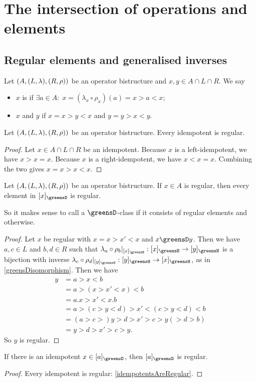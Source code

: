 \section{The intersection of operations and elements}
\subsection{Regular elements and generalised inverses}
\begin{definition}
Let $\left( A, (L, \lambda), (R,\rho) \right)$ be an operator bistructure and $x,y\in A\cap L\cap R$. We say
\begin{itemize}
\item $x$ is  if $\exists a\in A: \; x = (\lambda_x\circ\rho_x) (a) = x>a<x$;
\item $x$ and $y$  if $x = x>y<x$ and $y = y>x<y$.
\end{itemize}
\end{definition}

\begin{lemma} \label{idempotentsAreRegular}
Let $\left( A, (L, \lambda), (R,\rho) \right)$ be an operator bistructure. Every idempotent is regular.
\end{lemma}
\begin{proof}
Let $x\in A\cap L\cap R$ be an idempotent. Because $x$ is a left-idempotent, we have $x>x = x$. Because $x$ is a right-idempotent, we have $x<x = x$. Combining the two gives $x = x>x<x$.
\end{proof}

\begin{proposition}
Let $\left( A, (L, \lambda), (R,\rho) \right)$ be an operator bistructure. If $x\in A$ is regular, then every element in $[x]_{\greensD}$ is regular.
\end{proposition}
So it makes sense to call a $\greensD$-class  if it consists of regular elements and  otherwise.
\begin{proof}
Let $x$ be regular with $x = x>x'<x$ and $x\greensD y$. Then we have $a,c \in L$ and $b,d \in R$ such that
$\lambda_a\circ\rho_b|_{[x]_\greensH}: [x]_\greensH \to [y]_\greensH$ is a bijection with inverse $\lambda_c\circ \rho_d|_{[y]_\greensH}: [y]_\greensH \to [x]_\greensH$, as in \ref{greensDisomorphism}. Then we have
\begin{align*}
y &= a>x<b \\
&= a>(x>x'<x)<b \\
&= a . x>x'<x . b \\
&= a>(c>y<d)>x'<(c>y<d)<b \\
&= (a > c >) y > d > x' > c > y (> d > b) \\
&= y > d > x' > c > y.
\end{align*}
So $y$ is regular.
\end{proof}
\begin{corollary}
If there is an idempotent $x\in [a]_{\greensD}$, then $[a]_{\greensD}$ is regular.
\end{corollary}
\begin{proof}
Every idempotent is regular: \ref{idempotentsAreRegular}.
\end{proof}


